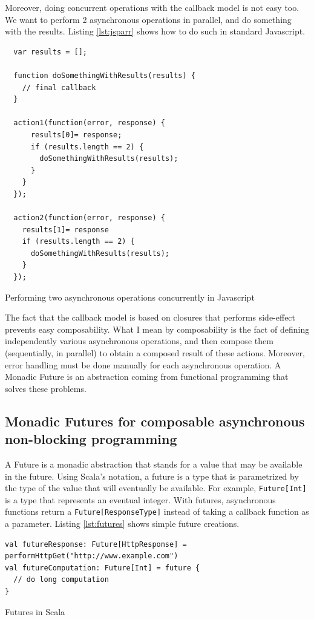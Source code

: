Moreover, doing concurrent operations with the callback model is not easy too. We want to perform 2 asynchronous operations in parallel,
and do something with the results. Listing \ref{lst:jsparr} shows how to do such in standard Javascript.

\begin{listing}[h]
\begin{verbatim}
  var results = [];

  function doSomethingWithResults(results) {
    // final callback
  }

  action1(function(error, response) {
      results[0]= response;
      if (results.length == 2) {
        doSomethingWithResults(results);
      }
    }
  });

  action2(function(error, response) {
    results[1]= response
    if (results.length == 2) {
      doSomethingWithResults(results);
    }
  });
\end{verbatim}
\caption{Performing two asynchronous operations concurrently in Javascript}
\label{lst:jsparr}
\end{listing}

The fact that the callback model is based on closures that performs side-effect prevents easy composability. What I mean by composability
is the fact of defining independently various asynchronous operations, and then compose them (sequentially, in parallel) to obtain a composed result
of these actions. Moreover, error handling must be done manually for each asynchronous operation. A Monadic Future is an abstraction coming from
functional programming that solves these problems.


\subsection{Monadic Futures for composable asynchronous non-blocking programming}

A Future is a monadic abstraction that stands for a value that may be available in the future. Using Scala's notation, a future is a type that is 
parametrized by the type of the value that will eventually be available. For example, \verb|Future[Int]| is a type that represents an eventual integer.
With futures, asynchronous functions return a \verb|Future[ResponseType]| instead of taking a callback function as a parameter. Listing \ref{lst:futures}
shows simple future creations.

\begin{listing}[h]
\begin{verbatim}
val futureResponse: Future[HttpResponse] = performHttpGet("http://www.example.com")
val futureComputation: Future[Int] = future {
  // do long computation
}
\end{verbatim}
\caption{Futures in Scala}
\label{lst:futures}
\end{listing}

